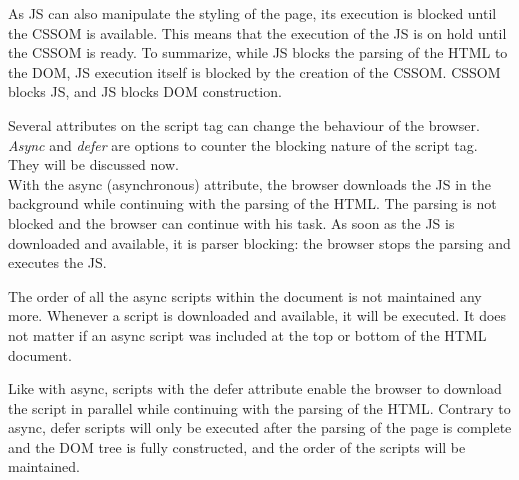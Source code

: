 


As JS can also manipulate the styling of the page, its execution is blocked until the CSSOM is available.
This means that the execution of the JS is on hold until the CSSOM is ready.
To summarize, while JS blocks the parsing of the HTML to the DOM, JS execution itself is blocked by the creation of the CSSOM.
CSSOM blocks JS, and JS blocks DOM construction. %

Several attributes on the script tag can change the behaviour of the browser.
\textit{Async} and \textit{defer} are options to counter the blocking nature of the script tag.
They will be discussed now.\\




With the async (asynchronous) attribute, the browser downloads the JS in the background while continuing with the parsing of the HTML.
The parsing is not blocked and the browser can continue with his task. 
As soon as the JS is downloaded and available,  it is parser blocking: the browser stops the parsing and executes the JS.%

The order of all the async scripts within the document is not maintained any more.
Whenever a script is downloaded and available, it will be executed.
It does not matter if an async script was included at the top or bottom of the HTML document. %






Like with async, scripts with the defer attribute enable the browser to download the script in parallel while continuing with the parsing of the HTML.
Contrary to async, defer scripts will only be executed after the parsing of the page is complete and the DOM tree is fully constructed,  and the order of the scripts will be maintained.  %


